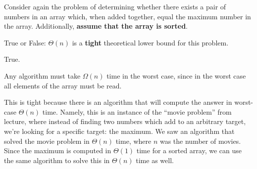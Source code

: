 \begin{prob}
    Consider again the problem of determining whether there exists a pair of numbers
    in an array which, when added together, equal the maximum number in the array.
    Additionally, \textbf{assume that the array is sorted}.

    True or False: $\Theta(n)$ is a \textbf{tight} theoretical lower bound for this
    problem.

    \Tf{}

    \begin{soln}
        True.

        Any algorithm must take $\Omega(n)$ time in the worst case, since in the worst
        case all elements of the array must be read.

        This is tight because there is an algorithm that will compute the answer in
        worst-case $\Theta(n)$ time. Namely, this is an instance of the ``movie problem''
        from lecture, where instead of finding two numbers which add to an arbitrary
        target, we're looking for a specific target: the maximum. We saw an algorithm
        that solved the movie problem in $\Theta(n)$ time, where $n$ was the number of
        movies.
        Since the maximum
        is computed in $\Theta(1)$ time for a sorted array, we can use the same algorithm
        to solve this in $\Theta(n)$ time as well.
    \end{soln}

\end{prob}
